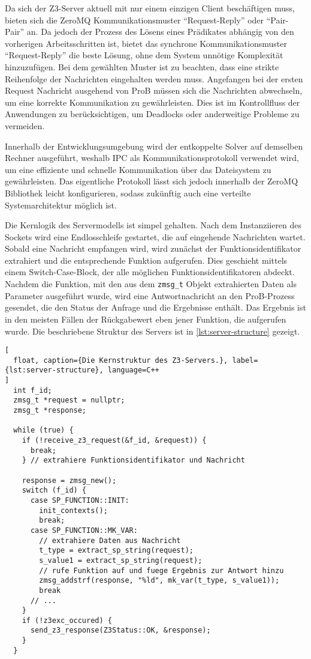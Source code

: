 Da sich der Z3-Server aktuell mit nur einem einzigen Client beschäftigen muss,
bieten sich die ZeroMQ Kommunikationsmuster \enquote{Request-Reply} oder \enquote{Pair-Pair} an.
Da jedoch der Prozess des Lösens eines Prädikates abhängig von den vorherigen Arbeitsschritten ist,
bietet das synchrone Kommunikationsmuster \enquote{Request-Reply} die beste Lösung, ohne dem System unnötige Komplexität hinzuzufügen.
Bei dem gewählten Muster ist zu beachten, dass eine strikte Reihenfolge der Nachrichten eingehalten werden muss.
Angefangen bei der ersten Request Nachricht ausgehend von ProB müssen sich die Nachrichten abwechseln, um eine korrekte Kommunikation zu gewährleisten.
Dies ist im Kontrollfluss der Anwendungen zu berücksichtigen, um Deadlocks oder anderweitige Probleme zu vermeiden.

Innerhalb der Entwicklungsumgebung wird der entkoppelte Solver auf demselben Rechner ausgeführt,
weshalb IPC als Kommunikationsprotokoll verwendet wird, um eine effiziente und schnelle Kommunikation über das Dateisystem zu gewährleisten.
Das eigentliche Protokoll lässt sich jedoch innerhalb der ZeroMQ Bibliothek leicht konfigurieren, sodass zukünftig auch eine verteilte Systemarchitektur möglich ist.

Die Kernlogik des Servermodells ist simpel gehalten.
Nach dem Instanziieren des Sockets wird eine Endlosschleife gestartet, die auf eingehende Nachrichten wartet.
Sobald eine Nachricht empfangen wird, wird zunächst der Funktionsidentifikator extrahiert und die entsprechende Funktion aufgerufen.
Dies geschieht mittels einem Switch-Case-Block, der alle möglichen Funktionsidentifikatoren abdeckt.
Nachdem die Funktion, mit den aus dem \texttt{zmsg\_t} Objekt extrahierten Daten als Parameter ausgeführt wurde,
wird eine Antwortnachricht an den ProB-Prozess gesendet, die den Status der Anfrage und die Ergebnisse enthält.
Das Ergebnis ist in den meisten Fällen der Rückgabewert eben jener Funktion, die aufgerufen wurde.
Die beschriebene Struktur des Servers ist in \cref{lst:server-structure} gezeigt.
\clearpage
\begin{lstlisting}[
  float, caption={Die Kernstruktur des Z3-Servers.}, label={lst:server-structure}, language=C++
]
  int f_id;
  zmsg_t *request = nullptr;
  zmsg_t *response;

  while (true) {
    if (!receive_z3_request(&f_id, &request)) {
      break;
    } // extrahiere Funktionsidentifikator und Nachricht

    response = zmsg_new();
    switch (f_id) {
      case SP_FUNCTION::INIT:
        init_contexts();
        break;
      case SP_FUNCTION::MK_VAR:
        // extrahiere Daten aus Nachricht
        t_type = extract_sp_string(request);
        s_value1 = extract_sp_string(request);
        // rufe Funktion auf und fuege Ergebnis zur Antwort hinzu
        zmsg_addstrf(response, "%ld", mk_var(t_type, s_value1));
        break
      // ...
    }
    if (!z3exc_occured) {
      send_z3_response(Z3Status::OK, &response);
    }
  }
\end{lstlisting}

